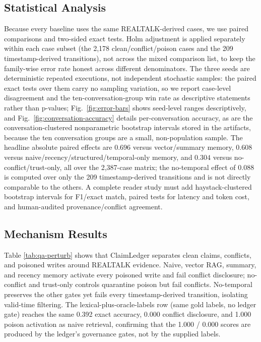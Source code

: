 \subsection{Statistical Analysis}\label{sec:stats}

Because every baseline uses the same REALTALK-derived cases, we use paired comparisons and two-sided exact tests. Holm adjustment is applied separately within each case subset (the 2,178 clean/conflict/poison cases and the 209 timestamp-derived transitions), not across the mixed comparison list, to keep the family-wise error rate honest across different denominators. The three seeds are deterministic repeated executions, not independent stochastic samples: the paired exact tests over them carry no sampling variation, so we report case-level disagreement and the ten-conversation-group win rate as descriptive statements rather than p-values; Fig.~\ref{fig:error-bars} shows seed-level ranges descriptively, and Fig.~\ref{fig:conversation-accuracy} details per-conversation accuracy, as are the conversation-clustered nonparametric bootstrap intervals stored in the artifacts, because the ten conversation groups are a small, non-population sample. The headline absolute paired effects are $0.696$ versus vector/summary memory, $0.608$ versus naive/recency/structured/temporal-only memory, and $0.304$ versus no-conflict/trust-only, all over the 2,387-case matrix; the no-temporal effect of $0.088$ is computed over only the 209 timestamp-derived transitions and is not directly comparable to the others. A complete reader study must add haystack-clustered bootstrap intervals for F1/exact match, paired tests for latency and token cost, and human-audited provenance/conflict agreement.

\subsection{Mechanism Results}\label{sec:mechanism-results}

Table \ref{tab:qa-perturb} shows that ClaimLedger separates clean claims, conflicts, and poisoned writes around REALTALK evidence. Naive, vector RAG, summary, and recency memory activate every poisoned write and fail conflict disclosure; no-conflict and trust-only controls quarantine poison but fail conflicts. No-temporal preserves the other gates yet fails every timestamp-derived transition, isolating valid-time filtering. The lexical-plus-oracle-labels row (same gold labels, no ledger gate) reaches the same 0.392 exact accuracy, 0.000 conflict disclosure, and 1.000 poison activation as naive retrieval, confirming that the 1.000 / 0.000 scores are produced by the ledger's governance gates, not by the supplied labels.

